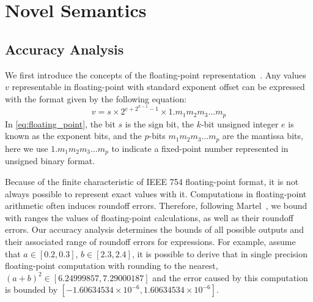 \section{Novel Semantics}
\label{sec:semantics}

\subsection{Accuracy Analysis}

We first introduce the concepts of the floating-point
representation~\cite{ieee754}. Any values $v$ representable in floating-point
with standard exponent offset can be expressed with the format given by the
following equation:
\begin{equation}
    v = s \times 2^{e + 2^{k - 1} - 1} \times 1.{m_1 m_2 m_3 \ldots m_p}
    \label{eq:floating_point}
\end{equation}
In \eqref{eq:floating_point}, the bit $s$ is the sign bit, the $k$-bit unsigned
integer $e$ is known as the exponent bits, and the $p$-bits $m_1 m_2 m_3
\ldots m_p$ are the mantissa bits, here we use $1.{m_1 m_2 m_3 \ldots m_p}$ to
indicate a fixed-point number represented in unsigned binary format.

Because of the finite characteristic of IEEE 754 floating-point format, it
is not always possible to represent exact values with it. Computations in
floating-point arithmetic often induces roundoff errors. Therefore, following
Martel~\cite{martel07}, we bound with ranges the values of floating-point
calculations, as well as their roundoff errors. Our accuracy analysis
determines the bounds of all possible outputs and their associated range
of roundoff errors for expressions. For example, assume that $a \in [0.2,
0.3]$, $b \in [2.3, 2.4]$, it is possible to derive that in single precision
floating-point computation with rounding to the nearest, ${(a + b)}^2 \in
[6.24999857, 7.29000187]$ and the error caused by this computation is bounded
by $[-1.60634534\times10^{-6}, 1.60634534\times10^{-6}]$.

